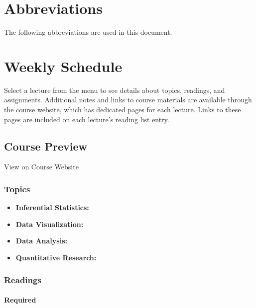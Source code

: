 \documentclass[]{book}
\providecommand{\tightlist}{%
  \setlength{\itemsep}{0pt}\setlength{\parskip}{0pt}}
\theoremstyle{definition}
\theoremstyle{definition}
\theoremstyle{definition}
\theoremstyle{remark}
\begin{document}
\chapter{Abbreviations}\label{abbreviations}

The following abbreviations are used in this document.

\chapter{Weekly Schedule}\label{weekly-schedule}

Select a lecture from the menu to see details about topics, readings,
and assignments. Additional notes and links to course materials are
available through the \href{https://slu-soc5050.github.io}{course
website}, which has dedicated pages for each lecture. Links to these
pages are included on each lecture's reading list entry.

\section{Course Preview}\label{course-preview}

View on Course Website

\subsection*{Topics}\label{topics}

\begin{itemize}
\tightlist
\item
  \textbf{Inferential Statistics:}
\item
  \textbf{Data Visualization:}
\item
  \textbf{Data Analysis:}
\item
  \textbf{Quantitative Research:}
\end{itemize}

\subsection*{Readings}\label{readings-1}

\subsubsection*{Required}\label{required}
\end{document}
